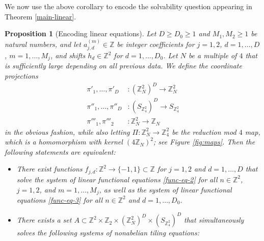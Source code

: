 \documentclass[reqno,a4paper,12pt]{amsart}
\numberwithin{equation}{section}
\numberwithin{figure}{section}
\def\Z{\mathbb{Z}}
\renewcommand\geq{\geqslant}
\theoremstyle{plain}
\newtheorem{proposition}[thm]{Proposition}
\theoremstyle{definition}
\begin{document}
We now use the above corollary to encode the solvability question appearing in Theorem \ref{main-linear}.

\begin{proposition}[Encoding linear equations]\label{linear-encoding}  Let $D \geq D_0 \geq 1$ and $M_1, M_2 \geq 1$ be natural numbers, and let  $a_{j,d}^{(m)} \in \Z$ be integer coefficients for $j=1,2$, $d=1,\dots,D$, $m=1,\dots,M_j$, and shifts $h_d \in \Z^2$ for $d=1,\dots,D_0$.  Let $N$ be a multiple of $4$ that is sufficiently large depending on all previous data.  We  define the coordinate projections
\begin{align*}
\pi'_1,\dots,\pi'_D &\colon (\Z_N^2)^D \to \Z_N^2 \\
\pi''_1,\dots,\pi''_{D} &\colon (S_{\Z_4^2})^{D} \to S_{\Z_4^2} \\
\pi'''_1, \pi'''_2 &\colon \Z_N^2 \to \Z_N
\end{align*}
in the obvious fashion, while also letting $\Pi \colon \Z_N^2 \to \Z_4^2$ be the reduction mod $4$ map, which is a homomorphism with kernel $(4\Z_N)^2$; see Figure \ref{fig:maps}.  
Then the following statements are equivalent:
\begin{itemize}
\item[(i)]  There exist functions $f_{j,d} \colon \Z^2 \to \{-1,1\} \subset \Z$ for $j=1,2$ and $d=1,\dots,D$ that solve
the system of linear functional equations \eqref{func-eq-2} for all $n \in \Z^2$, $j=1,2$, and $m = 1,\dots,M_j$, as well as the system of linear functional equations \eqref{func-eq-3} for all $n \in \Z^2$ and $d=1,\dots,D_0$.
\item[(ii)]  There exists a set $A \subset \Z^2 \times \Z_2 \times (\Z_N^2)^D \times (S_{\Z_4^2})^D$ that simultaneously solves the following systems of nonabelian tiling equations:


\end{itemize}
\end{proposition}
\end{document}
